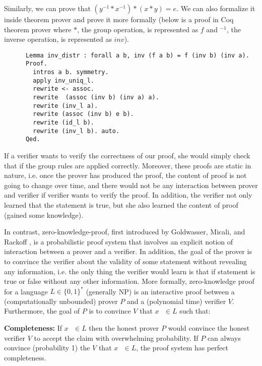      \noindent
      Similarly, we can prove that $(y^{-1} * x^{-1}) *   (x * y) = e $.
      We can also formalize it inside theorem prover and prove it more formally (below is a proof in Coq theorem prover where 
      $*$, the group operation, is represented as $f$ and $^{-1}$, the inverse operation, is represented as $inv$).
      
      \begin{verbatim}
      Lemma inv_distr : forall a b, inv (f a b) = f (inv b) (inv a).
      Proof.
        intros a b. symmetry. 
        apply inv_uniq_l.
        rewrite <- assoc.
        rewrite  (assoc (inv b) (inv a) a).
        rewrite (inv_l a).
        rewrite (assoc (inv b) e b).
        rewrite (id_l b).
        rewrite (inv_l b). auto.
      Qed.
      \end{verbatim}
     
     If a verifier wants to verify the correctness of our proof,  she would simply check that if the group rules are applied correctly. 
     Moreover, these proofs 
     are static in nature, i.e. once the prover has produced the proof,  the content of proof is not going to change over time, and
     there would not be any interaction between prover and verifier if verifier wants to verify the proof.  In addition, the verifier 
     not only learned that the statement is true, but she also learned the content of proof (gained some knowledge).
     
     In contrast, zero-knowledge-proof, first introduced by Goldwasser, Micali, and Rackoff \citep{Goldwasser:1985:STOC} , 
     is a probabilistic proof system that involves an explicit notion of  interaction between 
     a prover and a verifier. In addition, 
     the goal of the prover is to convince the verifier about the validity of some statement without revealing any information, i.e. 
     the only thing the verifier would learn is that if statement is true or false without any other information. 
     More formally, zero-knowledge proof for a language $L \in \{0, 1\}^{*} $ (generally NP) is an interactive proof  
     between a (computationally unbounded) prover $P$ and a (polynomial time) verifier $V$. Furthermore, 
     the goal of $P$ is to convince $V$ that $x \text{  } \in L$  such that:
   
     \textbf{Completeness:} If $x \text{  } \in  L$ then the honest prover $P$ would convince the 
       honest verifier $V$ to accept the claim with overwhelming probability. 
       If $P$ can always convince (probability 1) the $V$ that $x \text{  }\in L$, the proof system has perfect completeness. 
    
